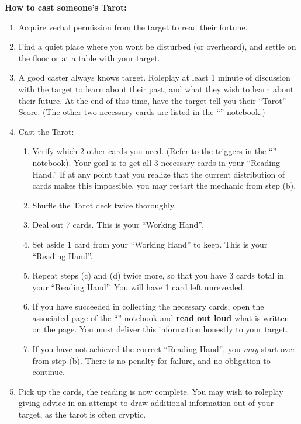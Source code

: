 \documentclass[green]{NeptuneBall}
\begin{document}
{\bf How to cast someone's Tarot:}
\begin{enumerate}
  \item Acquire verbal permission from the target to read their fortune.
  \item Find a quiet place where you wont be disturbed (or overheard), and settle on the floor or at a table with your target.
  \item A good caster always knows \cSlave{\their} target. Roleplay at least 1 minute of discussion with the target to learn about their past, and what they wish to learn about their future. At the end of this time, have the target tell you their ``Tarot'' Score. (The other two necessary cards are listed in the ``\mTarot{\MYname}'' notebook.)
  \item Cast the Tarot:
  \begin{enumerate}
    \item Verify which 2 other cards you need. (Refer to the triggers in the ``\mTarot{\MYname}'' notebook). Your goal is to get all 3 necessary cards in your ``Reading Hand.'' If at any point that you realize that the current distribution of cards makes this impossible, you may restart the mechanic from step (b).
    \item Shuffle the Tarot deck twice thoroughly.
    \item Deal out 7 cards. This is your ``Working Hand''. 
    \item Set aside {\bf 1} card from your ``Working Hand'' to keep. This is your ``Reading Hand''.
    \item Repeat steps (c) and (d) twice more, so that you have 3 cards total in your ``Reading Hand''. You will have 1 card left unrevealed.
    \item If you have succeeded in collecting the necessary cards, open the associated page of the ``\mTarot{\MYname}'' notebook and {\bf read out loud} what is written on the page. You must deliver this information honestly to your target.
    \item If you have not achieved the correct ``Reading Hand'', you \emph{may} start over from step (b). There is no penalty for failure, and no obligation to continue.
  \end{enumerate}
  \item Pick up the cards, the reading is now complete. You may wish to roleplay giving advice in an attempt to draw additional information out of your target, as the tarot is often cryptic.
\end{enumerate}
\end{document}
